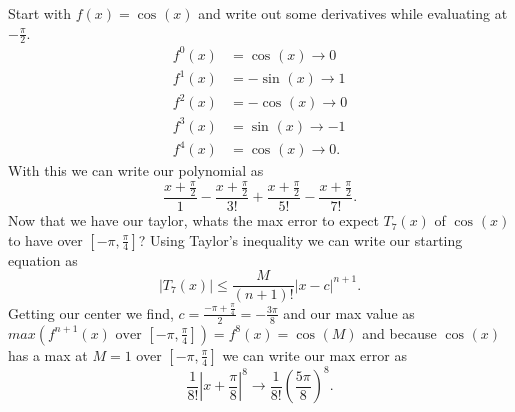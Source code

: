 {
	Start with $ f\left( x \right) =\cos^{  } \left( x \right)  $ and write out some derivatives while evaluating at $ -\frac{ \pi }{ 2 }  $.
	\begin{align*}
		f^{ 0 }\left( x \right) &=\cos^{  } \left( x \right) \to 0 \\
		f^{ 1 }\left( x \right) &= -\sin^{  } \left( x \right) \to 1 \\
		f^{ 2 }\left( x \right) &=-\cos^{  } \left( x \right) \to 0 \\
		f^{ 3 }\left( x \right) &= \sin^{  } \left( x \right) \to -1 \\
		f^{ 4 }\left( x \right) &= \cos^{  } \left( x \right) \to 0
	.\end{align*}
	With this we can write our polynomial as
	\[
	\frac{ x+\frac{ \pi }{ 2 }  }{ 1 }-\frac{ x+\frac{ \pi }{ 2 }  }{ 3! }+\frac{ x+\frac{ \pi }{ 2 }  }{ 5! }-\frac{ x+\frac{ \pi }{ 2 }  }{ 7! }
	.\] 
	Now that we have our taylor, whats the max error to expect $ T_7\left( x \right)  $ of $ \cos^{  } \left( x \right)  $ to have over $ \left[ -\pi ,\frac{ \pi }{ 4 }  \right]  $?
	Using Taylor's inequality we can write our starting equation as
	\[
	\left| T_7\left( x \right)  \right|\le \frac{ M }{ \left( n+1 \right) ! } \left| x-c \right|^{ n+1 }
	.\] 
	Getting our center we find, $ c= \frac{ -\pi + \frac{ \pi }{ 4 }  }{ 2 } = -\frac{ 3\pi }{ 8 }  $ and our max value as $ max\left( f^{ n+1 }\left( x \right) \text{ over } \left[ -\pi , \frac{ \pi }{ 4 }  \right] \right) = f^{ 8 }\left( x \right) =\cos^{  } \left( M \right)  $ and because $ \cos^{  } \left( x \right)  $ has a max at $ M=1 $ over $ \left[ -\pi , \frac{ \pi }{ 4 }  \right]  $ we can write our max error as
	\[
	\frac{ 1 }{ 8! } \left| x+\frac{ \pi }{ 8 }  \right|^{ 8 } \to \frac{ 1 }{ 8! } \left( \frac{ 5\pi }{ 8 }   \right) ^{ 8 }
	.\] 

} 
